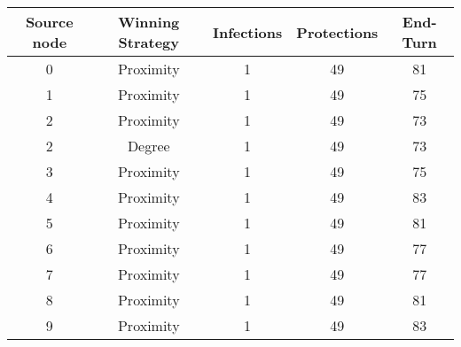 \documentclass[results.tex]{subfiles}
\begin{document}
    \begin{center}
        \begin{tabular}{| c || c | c | c | c |}
            \hline
            {\bfseries Source node} & {\bfseries Winning Strategy} & {\bfseries Infections} & {\bfseries Protections}
            & {\bfseries End-Turn}
            \\  %
            \hline\hline
            0                       & Proximity                    & 1                      & 49                      & 81                   \\
            \hline
            1                       & Proximity                    & 1                      & 49                      & 75                   \\
            \hline
            2                       & Proximity                    & 1                      & 49                      & 73                   \\
            \hline
            2                       & Degree                       & 1                      & 49                      & 73                   \\
            \hline
            3                       & Proximity                    & 1                      & 49                      & 75                   \\
            \hline
            4                       & Proximity                    & 1                      & 49                      & 83                   \\
            \hline
            5                       & Proximity                    & 1                      & 49                      & 81                   \\
            \hline
            6                       & Proximity                    & 1                      & 49                      & 77                   \\
            \hline
            7                       & Proximity                    & 1                      & 49                      & 77                   \\
            \hline
            8                       & Proximity                    & 1                      & 49                      & 81                   \\
            \hline
            9                       & Proximity                    & 1                      & 49                      & 83                   \\

\end{tabular}
\end{center}
\end{document}
